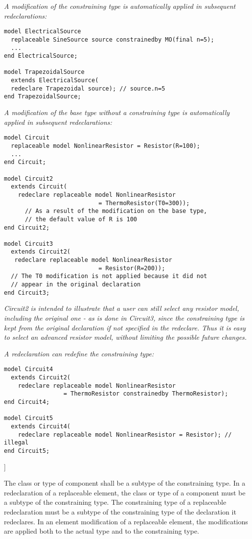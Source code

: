 \emph{A modification of the constraining type is automatically applied
in subsequent redeclarations:}
\begin{lstlisting}[language=modelica]
model ElectricalSource
  replaceable SineSource source constrainedby MO(final n=5);
  ...
end ElectricalSource;

model TrapezoidalSource
  extends ElectricalSource(
  redeclare Trapezoidal source); // source.n=5
end TrapezoidalSource;
\end{lstlisting}

\emph{A modification of the base type without a constraining type is
automatically applied in subsequent redeclarations:}
\begin{lstlisting}[language=modelica]
model Circuit
  replaceable model NonlinearResistor = Resistor(R=100);
  ...
end Circuit;

model Circuit2
  extends Circuit(
    redeclare replaceable model NonlinearResistor
                           = ThermoResistor(T0=300));
      // As a result of the modification on the base type,
      // the default value of R is 100
end Circuit2;

model Circuit3
  extends Circuit2(
   redeclare replaceable model NonlinearResistor
                           = Resistor(R=200));
  // The T0 modification is not applied because it did not
  // appear in the original declaration
end Circuit3;
\end{lstlisting}

\emph{Circuit2 is intended to illustrate that a user can still select
any resistor model, including the original one - as is done in Circuit3,
since the constraining type is kept from the original declaration if not
specified in the redeclare. Thus it is easy to select an advanced
resistor model, without limiting the possible future changes. }

\emph{A redeclaration can redefine the constraining type:}
\begin{lstlisting}[language=modelica]
model Circuit4
  extends Circuit2(
    redeclare replaceable model NonlinearResistor
                 = ThermoResistor constrainedby ThermoResistor);
end Circuit4;

model Circuit5
  extends Circuit4(
    redeclare replaceable model NonlinearResistor = Resistor); // illegal
end Circuit5;
\end{lstlisting}

{]}

The class or type of component shall be a subtype of the constraining
type. In a redeclaration of a replaceable element, the class or type of
a component must be a subtype of the constraining type. The constraining
type of a replaceable redeclaration must be a subtype of the
constraining type of the declaration it redeclares. In an element
modification of a replaceable element, the modifications are applied
both to the actual type and to the constraining type.

